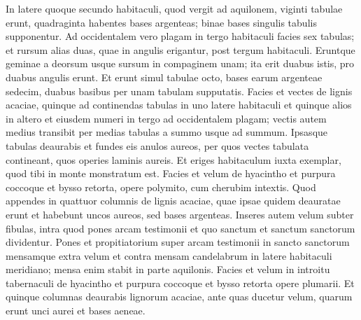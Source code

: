 \begin{biblechapter}
\begin{biblechapter}
\begin{biblechapter}
\begin{biblechapter}
\begin{biblechapter}
\begin{biblechapter}
\begin{biblechapter}
\begin{biblechapter}
\begin{biblechapter}
\begin{biblechapter}
\begin{biblechapter}
\begin{biblechapter}
\begin{biblechapter}
\begin{biblechapter}
\begin{biblechapter}
\begin{biblechapter}
\begin{biblechapter}
\begin{biblechapter}
\begin{biblechapter}
\begin{biblechapter}
\begin{biblechapter}
\begin{biblechapter}
\begin{biblechapter}
\begin{biblechapter}
\begin{biblechapter}
\begin{biblechapter}
\verse In latere quoque secundo habitaculi, quod vergit ad aquilonem, viginti tabulae erunt, 
\verse quadraginta habentes bases argenteas; binae bases singulis tabulis supponentur. 
\verse Ad occidentalem vero plagam in tergo habitaculi facies sex tabulas; 
\verse et rursum alias duas, quae in angulis erigantur, post tergum habitaculi. 
\verse Eruntque geminae a deorsum usque sursum in compaginem unam; ita erit duabus istis, pro duabus angulis erunt. 
\verse Et erunt simul tabulae octo, bases earum argenteae sedecim, duabus basibus per unam tabulam supputatis.
 \verse Facies et vectes de lignis acaciae, quinque ad continendas tabulas in uno latere habitaculi 
\verse et quinque alios in altero et eiusdem numeri in tergo ad occidentalem plagam; 
\verse vectis autem medius transibit per medias tabulas a summo usque ad summum. 
\verse Ipsasque tabulas deaurabis et fundes eis anulos aureos, per quos vectes tabulata contineant, quos operies laminis aureis. 
\verse Et eriges habitaculum iuxta exemplar, quod tibi in monte monstratum est.
 \verse Facies et velum de hyacintho et purpura coccoque et bysso retorta, opere polymito, cum cherubim intextis. 
\verse Quod appendes in quattuor columnis de lignis acaciae, quae ipsae quidem deauratae erunt et habebunt uncos aureos, sed bases argenteas. 
\verse Inseres autem velum subter fibulas, intra quod pones arcam testimonii et quo sanctum et sanctum sanctorum dividentur. 
\verse Pones et propitiatorium super arcam testimonii in sancto sanctorum 
\verse mensamque extra velum et contra mensam candelabrum in latere habitaculi meridiano; mensa enim stabit in parte aquilonis.
 \verse Facies et velum in introitu tabernaculi de hyacintho et purpura coccoque et bysso retorta opere plumarii. 
\verse Et quinque columnas deaurabis lignorum acaciae, ante quas ducetur velum, quarum erunt unci aurei et bases aeneae.
 

\end{biblechapter}
\end{biblechapter}
\end{biblechapter}
\end{biblechapter}
\end{biblechapter}
\end{biblechapter}
\end{biblechapter}
\end{biblechapter}
\end{biblechapter}
\end{biblechapter}
\end{biblechapter}
\end{biblechapter}
\end{biblechapter}
\end{biblechapter}
\end{biblechapter}
\end{biblechapter}
\end{biblechapter}
\end{biblechapter}
\end{biblechapter}
\end{biblechapter}
\end{biblechapter}
\end{biblechapter}
\end{biblechapter}
\end{biblechapter}
\end{biblechapter}
\end{biblechapter}
